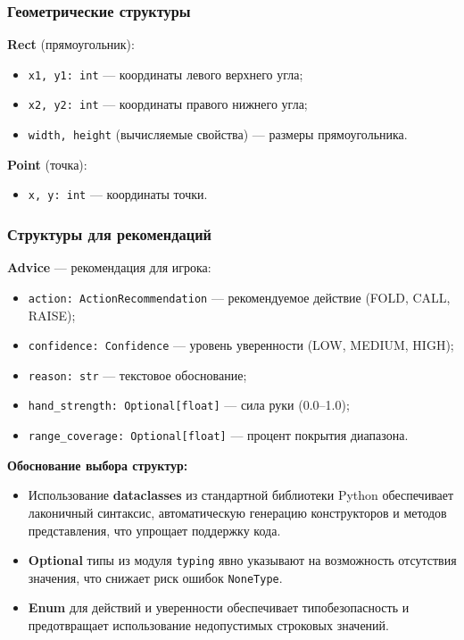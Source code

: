 \subsubsection*{Геометрические структуры}

\textbf{Rect} (прямоугольник):
\begin{itemize}
    \item \texttt{x1, y1: int} --- координаты левого верхнего угла;
    \item \texttt{x2, y2: int} --- координаты правого нижнего угла;
    \item \texttt{width, height} (вычисляемые свойства) --- размеры прямоугольника.
\end{itemize}

\textbf{Point} (точка):
\begin{itemize}
    \item \texttt{x, y: int} --- координаты точки.
\end{itemize}

\subsubsection*{Структуры для рекомендаций}

\textbf{Advice} --- рекомендация для игрока:
\begin{itemize}
    \item \texttt{action: ActionRecommendation} --- рекомендуемое действие (FOLD, CALL, RAISE);
    \item \texttt{confidence: Confidence} --- уровень уверенности (LOW, MEDIUM, HIGH);
    \item \texttt{reason: str} --- текстовое обоснование;
    \item \texttt{hand\_strength: Optional[float]} --- сила руки (0.0--1.0);
    \item \texttt{range\_coverage: Optional[float]} --- процент покрытия диапазона.
\end{itemize}

\textbf{Обоснование выбора структур:}
\begin{itemize}
    \item Использование \textbf{dataclasses} из стандартной библиотеки Python обеспечивает лаконичный синтаксис, автоматическую генерацию конструкторов и методов представления, что упрощает поддержку кода.
    \item \textbf{Optional} типы из модуля \texttt{typing} явно указывают на возможность отсутствия значения, что снижает риск ошибок \texttt{NoneType}.
    \item \textbf{Enum} для действий и уверенности обеспечивает типобезопасность и предотвращает использование недопустимых строковых значений.
\end{itemize}

